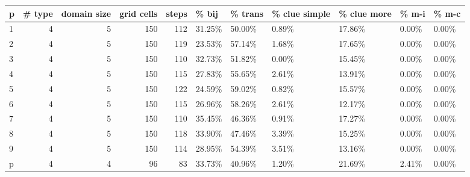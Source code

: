 \begin{tabular}{lrrrrllllll}
\toprule
 p &  \# type &  domain size &  grid cells &  steps &   \% bij & \% trans & \% clue simple & \% clue more &  \% m-i &  \% m-c \\
\midrule
 1 &       4 &            5 &         150 &    112 &  31.25\% &  50.00\% &         0.89\% &      17.86\% &  0.00\% &  0.00\% \\
 2 &       4 &            5 &         150 &    119 &  23.53\% &  57.14\% &         1.68\% &      17.65\% &  0.00\% &  0.00\% \\
 3 &       4 &            5 &         150 &    110 &  32.73\% &  51.82\% &         0.00\% &      15.45\% &  0.00\% &  0.00\% \\
 4 &       4 &            5 &         150 &    115 &  27.83\% &  55.65\% &         2.61\% &      13.91\% &  0.00\% &  0.00\% \\
 5 &       4 &            5 &         150 &    122 &  24.59\% &  59.02\% &         0.82\% &      15.57\% &  0.00\% &  0.00\% \\
 6 &       4 &            5 &         150 &    115 &  26.96\% &  58.26\% &         2.61\% &      12.17\% &  0.00\% &  0.00\% \\
 7 &       4 &            5 &         150 &    110 &  35.45\% &  46.36\% &         0.91\% &      17.27\% &  0.00\% &  0.00\% \\
 8 &       4 &            5 &         150 &    118 &  33.90\% &  47.46\% &         3.39\% &      15.25\% &  0.00\% &  0.00\% \\
 9 &       4 &            5 &         150 &    114 &  28.95\% &  54.39\% &         3.51\% &      13.16\% &  0.00\% &  0.00\% \\
 p &       4 &            4 &          96 &     83 &  33.73\% &  40.96\% &         1.20\% &      21.69\% &  2.41\% &  0.00\% \\
\bottomrule
\end{tabular}
